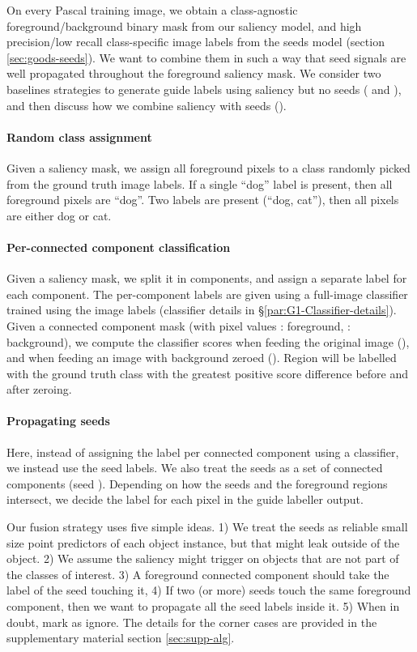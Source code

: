\documentclass[british,10pt,twocolumn,letterpaper]{article}
\begin{document}
 On every Pascal training image, we obtain a class-agnostic foreground/background
 binary mask from our saliency model, and high precision/low recall
 class-specific image labels from the seeds model (section \ref{sec:goods-seeds}).
 We want to combine them in such a way that seed signals are well propagated
 throughout the foreground saliency mask. We consider two baselines
 strategies to generate guide labels using saliency but no seeds (
 and ), and then discuss how we combine saliency
 with seeds (). 

\paragraph{ Random class assignment}

Given a saliency mask, we assign all foreground pixels to a class
randomly picked from the ground truth image labels. If a single ``dog''
label is present, then all foreground pixels are ``dog''. Two labels
are present (``dog, cat''), then all pixels are either dog or cat.

\paragraph{ Per-connected component classification}

Given a saliency mask, we split it in components, and assign a separate
label for each component. The per-component labels are given using
a full-image classifier trained using the image labels (classifier
details in \S \ref{par:G1-Classifier-details}). Given a connected
component mask  (with pixel values : foreground,
: background), we compute the classifier scores when feeding the
original image (), and when feeding an image with background zeroed
(). Region  will be labelled with
the ground truth class with the greatest positive score difference
before and after zeroing.

\paragraph{ Propagating seeds}

Here, instead of assigning the label per connected component 
using a classifier, we instead use the seed labels. We also treat
the seeds as a set of connected components (seed ). Depending
on how the seeds and the foreground regions intersect, we decide the
label for each pixel in the guide labeller output. 

Our fusion strategy uses five simple ideas. 1) We treat the seeds
as reliable small size point predictors of each object instance, but
that might leak outside of the object. 2) We assume the saliency might
trigger on objects that are not part of the classes of interest. 3)
A foreground connected component  should take the label
of the seed touching it, 4) If two (or more) seeds touch the same
foreground component, then we want to propagate all the seed labels
inside it. 5) When in doubt, mark as ignore. The details for the corner
cases are provided in the supplementary material section \ref{sec:supp-alg}.
\end{document}
